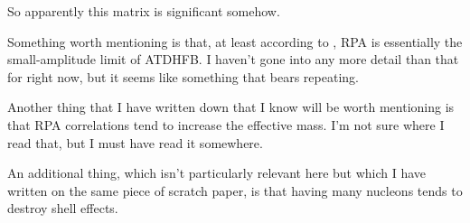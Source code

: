 So apparently this matrix is significant somehow.

Something worth mentioning is that, at least according to \cite{Baranger1978}, RPA is essentially the small-amplitude limit of ATDHFB. I haven't gone into any more detail than that for right now, but it seems like something that bears repeating.

Another thing that I have written down that I know will be worth mentioning is that RPA correlations tend to increase the effective mass. I'm not sure where I read that, but I must have read it somewhere.

An additional thing, which isn't particularly relevant here but which I have written on the same piece of scratch paper, is that having many nucleons tends to destroy shell effects.